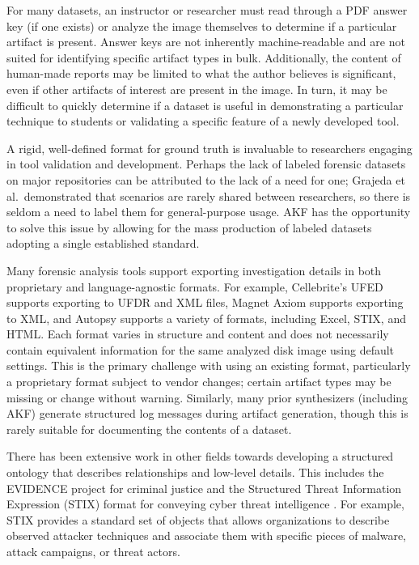 \documentclass[letterpaper,12pt]{report}
\begin{document}
For many datasets, an instructor or researcher must read through a PDF
answer key (if one exists) or analyze the image themselves to determine
if a particular artifact is present. Answer keys are not inherently
machine-readable and are not suited for identifying specific artifact
types in bulk. Additionally, the content of human-made reports may be
limited to what the author believes is significant, even if other
artifacts of interest are present in the image. In turn, it may be
difficult to quickly determine if a dataset is useful in demonstrating a
particular technique to students or validating a specific feature of a
newly developed tool.

A rigid, well-defined format for ground truth is invaluable to
researchers engaging in tool validation and development. Perhaps the
lack of labeled forensic datasets on major repositories can be
attributed to the lack of a need for one; Grajeda et al.~demonstrated
that scenarios are rarely shared between researchers, so there is seldom
a need to label them for general-purpose usage. AKF has the opportunity
to solve this issue by allowing for the mass production of labeled
datasets adopting a single established standard.

Many forensic analysis tools support exporting investigation details in
both proprietary and language-agnostic formats. For example,
Cellebrite's UFED supports exporting to UFDR and XML files, Magnet Axiom
supports exporting to XML, and Autopsy supports a variety of formats,
including Excel, STIX, and HTML. Each format varies in structure and
content and does not necessarily contain equivalent information for the
same analyzed disk image using default settings. This is the primary
challenge with using an existing format, particularly a proprietary
format subject to vendor changes; certain artifact types may be missing
or change without warning. Similarly, many prior synthesizers (including
AKF) generate structured log messages during artifact generation, though
this is rarely suitable for documenting the contents of a dataset.

There has been extensive work in other fields towards developing a
structured ontology that describes relationships and low-level details.
This includes the EVIDENCE project for criminal justice and the
Structured Threat Information Expression (STIX) format for conveying
cyber threat intelligence
\cite{caseyLeveragingCybOXStandardize2015}. For example, STIX
provides a standard set of objects that allows organizations to describe
observed attacker techniques and associate them with specific pieces of
malware, attack campaigns, or threat actors.
\end{document}
